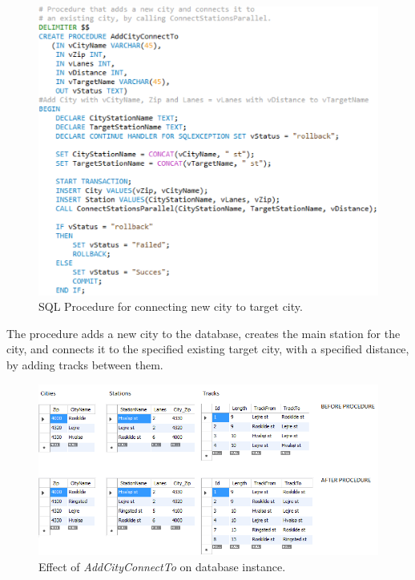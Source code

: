\begin{figure}[ht!]
    \centering
    \includegraphics[scale=.75]{img/SQL_PROCEDURE_AddCityConnect}
    \caption{SQL Procedure for connecting new city to target city.}
    \label{fig:connectcity}
\end{figure}

The procedure adds a new city to the database, creates the main station for the 
city, and connects it to the specified existing target city, with a specified 
distance, by adding tracks between them.

\begin{figure}[ht!]
    \centering
    \includegraphics[scale=.75]{img/SQL_PROCEDURE_AddCityConnect_example}
    \caption{Effect of \emph{AddCityConnectTo} on database instance.}
\end{figure}
\label{fig:effect}

